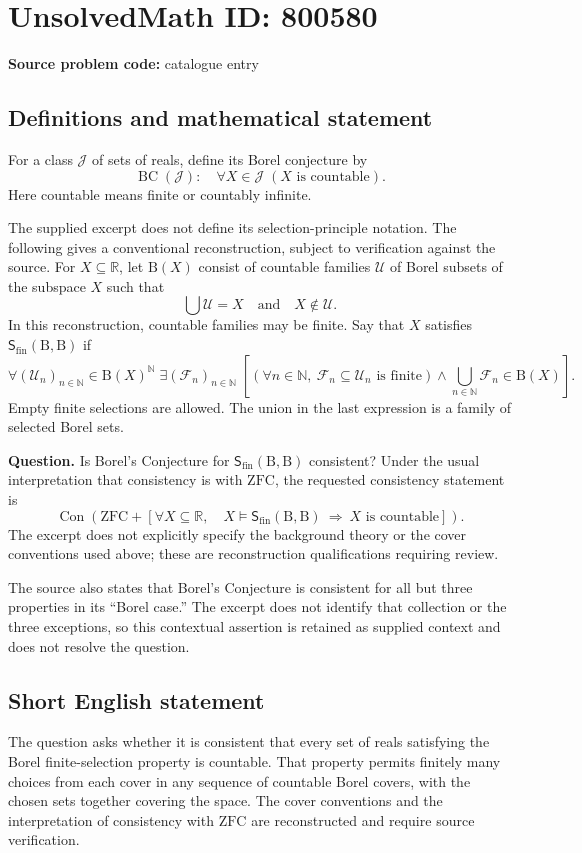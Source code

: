 \documentclass[11pt]{article}
\newcommand{\N}{\mathbb{N}}
\newcommand{\R}{\mathbb{R}}
\begin{document}
\section*{UnsolvedMath ID: 800580}
\textbf{Source problem code:} catalogue entry
\subsection{Definitions and mathematical statement}
For a class \(\mathcal J\) of sets of reals, define its Borel conjecture by
\[
\operatorname{BC}(\mathcal J):\quad
\forall X\in\mathcal J\; (X\text{ is countable}).
\]
Here countable means finite or countably infinite.

The supplied excerpt does not define its selection-principle notation. The following gives a conventional reconstruction, subject to verification against the source. For \(X\subseteq\R\), let \(\mathrm B(X)\) consist of countable families \(\mathcal U\) of Borel subsets of the subspace \(X\) such that
\[
\bigcup\mathcal U=X
\quad\text{and}\quad
X\notin\mathcal U.
\]
In this reconstruction, countable families may be finite. Say that \(X\) satisfies \(\mathsf S_{\mathrm{fin}}(\mathrm B,\mathrm B)\) if
\[
\forall (\mathcal U_n)_{n\in\N}\in\mathrm B(X)^{\N}\;
\exists (\mathcal F_n)_{n\in\N}\;
\left[
\left(\forall n\in\N,\ \mathcal F_n\subseteq\mathcal U_n
\text{ is finite}\right)
\land
\bigcup_{n\in\N}\mathcal F_n\in\mathrm B(X)
\right].
\]
Empty finite selections are allowed. The union in the last expression is a family of selected Borel sets.

\textbf{Question.} Is Borel's Conjecture for \(\mathsf S_{\mathrm{fin}}(\mathrm B,\mathrm B)\) consistent? Under the usual interpretation that consistency is with \(\mathrm{ZFC}\), the requested consistency statement is
\[
\operatorname{Con}\!\left(
\mathrm{ZFC}+
\left[\forall X\subseteq\R,\quad
X\models\mathsf S_{\mathrm{fin}}(\mathrm B,\mathrm B)
\ \Longrightarrow\ X\text{ is countable}\right]
\right).
\]
The excerpt does not explicitly specify the background theory or the cover conventions used above; these are reconstruction qualifications requiring review.

The source also states that Borel's Conjecture is consistent for all but three properties in its ``Borel case.'' The excerpt does not identify that collection or the three exceptions, so this contextual assertion is retained as supplied context and does not resolve the question.
\subsection{Short English statement}
The question asks whether it is consistent that every set of reals satisfying the Borel finite-selection property is countable. That property permits finitely many choices from each cover in any sequence of countable Borel covers, with the chosen sets together covering the space. The cover conventions and the interpretation of consistency with \(\mathrm{ZFC}\) are reconstructed and require source verification.
\end{document}
